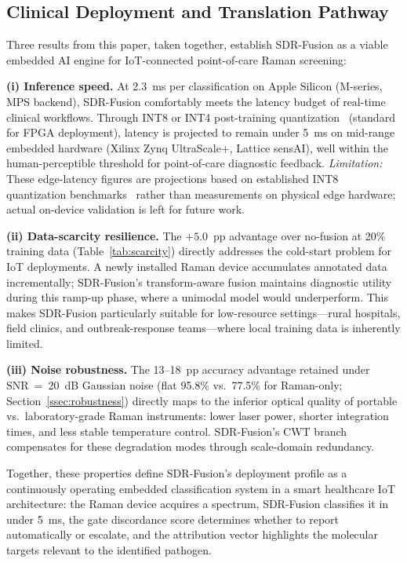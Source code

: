 \documentclass[preprint,12pt]{elsarticle}
\begin{document}
\subsection{Clinical Deployment and Translation Pathway}
\label{ssec:iot}

Three results from this paper, taken together, establish SDR-Fusion as a
viable embedded AI engine for IoT-connected point-of-care Raman
screening:

\textbf{(i) Inference speed.} At 2.3~ms per classification on Apple
Silicon (M-series, MPS backend), SDR-Fusion comfortably meets the latency budget of real-time
clinical workflows. Through INT8 or INT4 post-training quantization~\cite{jacob2018quantization,han2016deep}
(standard for FPGA deployment), latency is projected to remain under 5~ms on mid-range embedded
hardware (Xilinx Zynq UltraScale+, Lattice sensAI), well within the
human-perceptible threshold for point-of-care diagnostic feedback.
\textit{Limitation:} These edge-latency figures are projections based
on established INT8 quantization benchmarks~\cite{jacob2018quantization,han2016deep}
rather than measurements on physical edge hardware; actual on-device
validation is left for future work.

\textbf{(ii) Data-scarcity resilience.}
The $+5.0$~pp advantage over no-fusion at
20\% training data (Table~\ref{tab:scarcity}) directly addresses the
cold-start problem for IoT deployments. A newly installed Raman device
accumulates annotated data incrementally; SDR-Fusion's transform-aware
fusion maintains diagnostic utility during this ramp-up phase, where a
unimodal model would underperform. This makes SDR-Fusion particularly
suitable for low-resource settings---rural hospitals, field clinics,
and outbreak-response teams---where local training data is inherently
limited.

\textbf{(iii) Noise robustness.} The 13--18~pp accuracy advantage retained
under SNR~=~20~dB Gaussian noise (flat 95.8\% vs.\ 77.5\% for Raman-only;
Section~\ref{ssec:robustness}) directly maps to the inferior optical
quality of portable vs.\ laboratory-grade Raman instruments: lower
laser power, shorter integration times, and less stable temperature
control. SDR-Fusion's CWT branch compensates for these degradation modes
through scale-domain redundancy.

Together, these properties define SDR-Fusion's deployment profile as a
continuously operating embedded classification system in a smart
healthcare IoT architecture: the Raman device acquires a spectrum,
SDR-Fusion classifies it in under 5~ms, the gate discordance score
determines whether to report automatically or escalate, and the attribution vector highlights the molecular targets relevant to the
identified pathogen.
\end{document}
